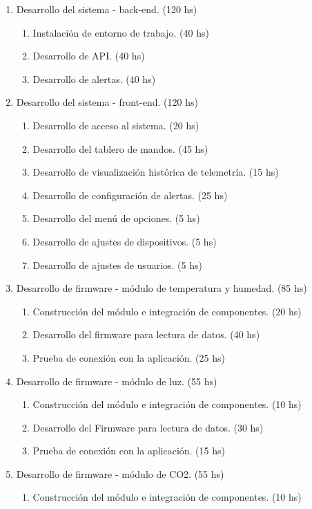 \documentclass[
11pt, %
]{charter}
\begin{document}
\begin{enumerate}
\begin{enumerate}
	\end{enumerate}
\item Desarrollo del sistema - back-end. (120 hs)
	\begin{enumerate}
	\item Instalación de entorno de trabajo. (40 hs)
	\item Desarrollo de API. (40 hs)
	\item Desarrollo de alertas. (40 hs)
	\end{enumerate}
\item Desarrollo del sistema - front-end. (120 hs)
	\begin{enumerate}
	\item Desarrollo de acceso al sistema. (20 hs)
	\item Desarrollo del tablero de mandos. (45 hs)
	\item Desarrollo de visualización histórica de telemetría. (15 hs)
	\item Desarrollo de configuración de alertas. (25 hs)
	\item Desarrollo del menú de opciones. (5 hs)
	\item Desarrollo de ajustes de dispositivos. (5 hs)
	\item Desarrollo de ajustes de usuarios. (5 hs)
	\end{enumerate}
\item Desarrollo de firmware - módulo de temperatura y humedad. (85 hs)
	\begin{enumerate}
	\item Construcción del módulo e integración de componentes. (20 hs)
	\item Desarrollo del firmware para lectura de datos. (40 hs)
	\item Prueba de conexión con la aplicación. (25 hs)
	\end{enumerate}
\item Desarrollo de firmware - módulo de luz. (55 hs)
	\begin{enumerate}
	\item Construcción del módulo e integración de componentes. (10 hs)
	\item Desarrollo del Firmware para lectura de datos. (30 hs)
	\item Prueba de conexión con la aplicación. (15 hs)
	\end{enumerate}
\item Desarrollo de firmware - módulo de CO2. (55 hs)
	\begin{enumerate}
	\item Construcción del módulo e integración de componentes. (10 hs)

\end{enumerate}
\end{enumerate}
\end{document}
